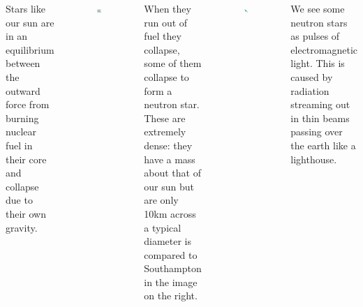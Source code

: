 \documentclass[20pt, a1paper, portrait, margin=0mm, innermargin=15mm]{tikzposter} %
\begin{document}
\begin{columns}
{Stars like our sun are in an equilibrium between the outward force from
burning nuclear fuel in their core and collapse due to their own gravity.
\begin{figure}
\begin{tikzfigure}
\centering
\includegraphics[width=0.9\linewidth]{img/southampton}
\end{tikzfigure}
\end{figure}
When they run out of fuel they collapse, some of them collapse to form a
neutron star. 
These are extremely dense: they have a mass about that of our sun but are only 10km across 
a typical diameter is compared to Southampton in the image on the right.

\begin{figure}
\begin{tikzfigure}
\centering
\includegraphics[width=0.9\linewidth]{img/star-crop}
\end{tikzfigure}
\end{figure}
We see some neutron stars as pulses of electromagnetic light. This is caused
by radiation streaming out in thin beams passing over the earth like a lighthouse. 

}
\end{columns}
\end{document}
